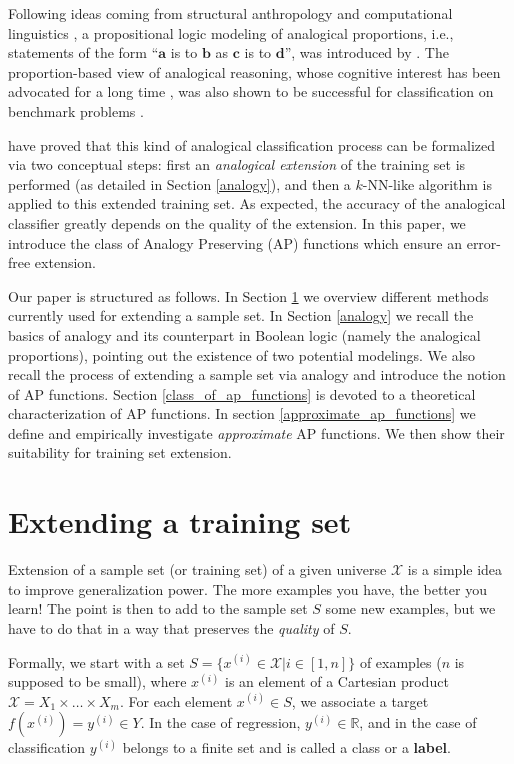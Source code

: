 \documentclass[article]{amsart}
\begin{document}
Following ideas coming from structural anthropology \cite{Klein1983} and
computational linguistics \cite{Lepage2001,StrYvoReport2005}, a propositional
logic modeling of analogical proportions, i.e., statements of the form
``$\mathbf{a}$ is to $\mathbf{b}$ as $\mathbf{c}$ is to $\mathbf{d}$'', was
introduced by \cite{MicPraECSQARU2009,PraRicLU2013}. The proportion-based view
of analogical reasoning, whose cognitive interest has been advocated for a long
time \cite{RumelhartAbrahamson1973}, was also shown to be successful for
classification on benchmark problems \cite{BayMicDel2007,BouPraRicECAI2014}.

\cite{HugPraRicSerECAI2016} have proved that this kind of analogical
classification process can be formalized via two conceptual steps: first an
{\it analogical  extension} of the training set is performed (as detailed in
Section \ref{analogy}), and then a $k$-NN-like algorithm is applied to this
extended training set.  As expected, the accuracy of the analogical classifier
greatly depends on the quality of the extension. In this  paper, we introduce
the class of Analogy Preserving (AP) functions which ensure an error-free
extension.

Our paper is structured as follows. In Section \ref{extending} we overview
different methods currently used for extending a sample set.  In Section
\ref{analogy} we recall the basics of analogy and its counterpart in Boolean
logic (namely the analogical proportions), pointing out the existence of two
potential modelings. We also recall the process of
extending a sample set via analogy and introduce the notion of AP functions.
Section \ref{class_of_ap_functions} is devoted to a theoretical
characterization of AP functions. In section \ref{approximate_ap_functions} we
define and empirically investigate \textit{approximate} AP functions. We then
show their suitability for training set extension.

\section{Extending a training set}\label{extending}
Extension of a sample set (or training set) of a given universe $\mathcal{X}$
is a simple idea to improve generalization power. The more examples you have,
the better you learn! The point is then to add to the sample set $S$ some new
examples, but we have to do that in a way that preserves the \textit{quality}
of $S$.

Formally, we start with a set $S= \{x^{(i)} \in \mathcal{X}| i \in [1,n]\}$ of
examples ($n$ is supposed to be small), where $x^{(i)}$ is an
element of a Cartesian product $\mathcal{X} = X_1 \times \ldots \times X_m$.
For each element  $x^{(i)} \in S$, we associate a target  $f(x^{(i)})=y^{(i)}
\in Y$.  In the case of regression, $y^{(i)} \in \mathbb{R}$, and in the case
of classification $y^{(i)}$ belongs to a finite set and is called a class
or a \textbf{label}.
\end{document}
